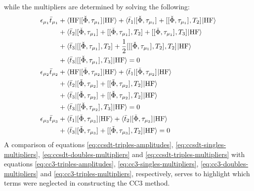 while the multipliers are determined by solving the following:
\begin{subequations}\label{eq:ccsdt-multipliers}
  \begin{align}
    \epsilon_{\mu_1}\bar{t}_{\mu_1} &+
    \braket{\mathrm{HF} | [ \check{\Phi}, \tau_{\mu_1} ]^{} | \mathrm{HF}} +
    \braket{\bar{t}_{1} |
      [ \check{\Phi}, \tau_{\mu_1} ]^{}
    + [ [ \check{\Phi}, \tau_{\mu_1} ]^{}, T_2 ]^{}
    | \mathrm{HF}} \nonumber \\
   &+ \braket{\bar{t}_{2} |
      [ \check{\Phi}, \tau_{\mu_1} ]^{}
    + [ [ \check{\Phi}, \tau_{\mu_1} ]^{}, T_2 ]^{}
    + [ [ \check{\Phi}, \tau_{\mu_1} ]^{}, T_3 ]^{}
    | \mathrm{HF}} \nonumber \\
   &+ \braket{\bar{t}_{3} |
      [ [ \check{\Phi}, \tau_{\mu_1} ]^{}, T_2 ]^{}
    + \frac{1}{2}[ [ [ \check{\Phi}, \tau_{\mu_1} ]^{}, T_2 ]^{}, T_2 ]^{}
    | \mathrm{HF}} \nonumber \\
   &+ \braket{\bar{t}_{3} |
     [ [ \check{\Phi}, \tau_{\mu_1} ]^{}, T_3 ]^{}
    | \mathrm{HF}}
             = 0 \label{eq:ccsdt-singles-multipliers} \\
    \epsilon_{\mu_2}\bar{t}_{\mu_2} &+
    \braket{\mathrm{HF} | [ \check{\Phi}, \tau_{\mu_2} ]^{} | \mathrm{HF}} +
    \braket{\bar{t}_{1} |
      [ \check{\Phi}, \tau_{\mu_2} ]^{}
    | \mathrm{HF}} \nonumber \\
   &+ \braket{\bar{t}_{2} |
      [ \check{\Phi}, \tau_{\mu_2} ]^{}
    + [ [ \check{\Phi}, \tau_{\mu_2} ]^{}, T_2 ]^{}
    | \mathrm{HF}} \nonumber \\
   &+ \braket{\bar{t}_{3} |
      [ \check{\Phi}, \tau_{\mu_2} ]^{}
    +  [ [ \check{\Phi}, \tau_{\mu_2} ]^{}, T_2 ]^{}
    | \mathrm{HF}} \nonumber \\
   &+ \braket{\bar{t}_{3} |
      [ [ \check{\Phi}, \tau_{\mu_2} ]^{}, T_3 ]^{}
    | \mathrm{HF}}
             = 0 \label{eq:ccsdt-doubles-multipliers} \\
    \epsilon_{\mu_3}\bar{t}_{\mu_3} &+
    \braket{\bar{t}_{1} |
      [ \check{\Phi}, \tau_{\mu_3} ]^{}
    | \mathrm{HF}}
    + \braket{\bar{t}_{2} |
      [ \check{\Phi}, \tau_{\mu_3} ]^{}
    | \mathrm{HF}} \nonumber \\
   &+ \braket{\bar{t}_{3} |
      [ \check{\Phi}, \tau_{\mu_3} ]^{}
    +  [ [ \check{\Phi}, \tau_{\mu_3} ]^{}, T_2 ]^{}
    | \mathrm{HF}}
             = 0 \label{eq:ccsdt-triples-multipliers}
  \end{align}
\end{subequations}
A comparison of equations \eqref{eq:ccsdt-triples-amplitudes},
\eqref{eq:ccsdt-singles-multipliers}, \eqref{eq:ccsdt-doubles-multipliers} and
\eqref{eq:ccsdt-triples-multipliers}
with equations \eqref{eq:cc3-triples-amplitudes},
\eqref{eq:cc3-singles-multipliers}, \eqref{eq:cc3-doubles-multipliers} and
\eqref{eq:cc3-triples-multipliers}, respectively, serves to highlight which terms were
neglected in constructing the \acrshort{CC3} method.

